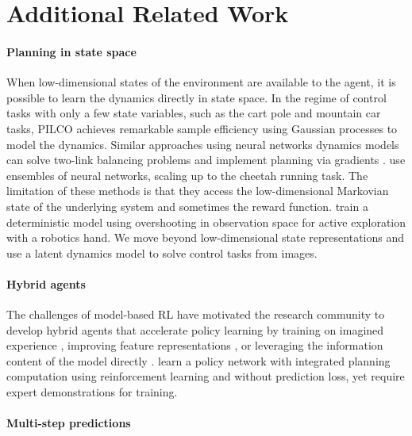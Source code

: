 \clearpage
\section{Additional Related Work}
\label{sec:more_related_work}

\paragraph{Planning in state space}

When low-dimensional states of the environment are available to the agent, it is possible to learn the dynamics directly in state space. In the regime of control tasks with only a few state variables, such as the cart pole and mountain car tasks, PILCO \citep{deisenroth2011pilco} achieves remarkable sample efficiency using Gaussian processes to model the dynamics. Similar approaches using neural networks dynamics models can solve two-link balancing problems \citep{gal2016deeppilco,higuera2018synthesizing} and implement planning via gradients \citep{henaff2018planbybackprop}. \citet{chua2018pets} use ensembles of neural networks, scaling up to the cheetah running task. The limitation of these methods is that they access the low-dimensional Markovian state of the underlying system and sometimes the reward function. \citet{amos2018awareness} train a deterministic model using overshooting in observation space for active exploration with a robotics hand. We move beyond low-dimensional state representations and use a latent dynamics model to solve control tasks from images.

\paragraph{Hybrid agents}

The challenges of model-based RL have motivated the research community to develop hybrid agents that accelerate policy learning by training on imagined experience \citep{kalweit2017blending,nagabandi2017mbmf,kurutach2018modeltrpo,buckman2018steve,ha2018worldmodels}, improving feature representations \citep{wayne2018merlin,igl2018dvrl}, or leveraging the information content of the model directly \citep{weber2017i2a}. \citet{srinivas2018upn} learn a policy network with integrated planning computation using reinforcement learning and without prediction loss, yet require expert demonstrations for training.

\paragraph{Multi-step predictions}

